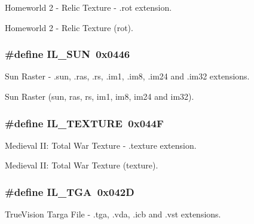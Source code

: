 Homeworld 2 -\/ Relic Texture -\/ .rot extension. 

Homeworld 2 -\/ Relic Texture (rot). \hypertarget{group__il__formats_ga0862d8715842e491fc49d1b8c77a7bcb}{
\subsubsection[{I\+L\+\_\+\+S\+U\+N}]{\setlength{\rightskip}{0pt plus 5cm}\#define I\+L\+\_\+\+S\+U\+N~0x0446}}\label{group__il__formats_ga0862d8715842e491fc49d1b8c77a7bcb}


Sun Raster -\/ .sun, .ras, .rs, .im1, .im8, .im24 and .im32 extensions. 

Sun Raster (sun, ras, rs, im1, im8, im24 and im32). \hypertarget{group__il__formats_gadbf6a57b74226ded9a04bf491d7c6ead}{
\subsubsection[{I\+L\+\_\+\+T\+E\+X\+T\+U\+R\+E}]{\setlength{\rightskip}{0pt plus 5cm}\#define I\+L\+\_\+\+T\+E\+X\+T\+U\+R\+E~0x044\+F}}\label{group__il__formats_gadbf6a57b74226ded9a04bf491d7c6ead}


Medieval I\+I\+: Total War Texture -\/ .texture extension. 

Medieval I\+I\+: Total War Texture (texture). \hypertarget{group__il__formats_ga5fb2bda79b1e3198ae2f05f8af93a14b}{
\subsubsection[{I\+L\+\_\+\+T\+G\+A}]{\setlength{\rightskip}{0pt plus 5cm}\#define I\+L\+\_\+\+T\+G\+A~0x042\+D}}\label{group__il__formats_ga5fb2bda79b1e3198ae2f05f8af93a14b}


True\+Vision Targa File -\/ .tga, .vda, .icb and .vst extensions. 


